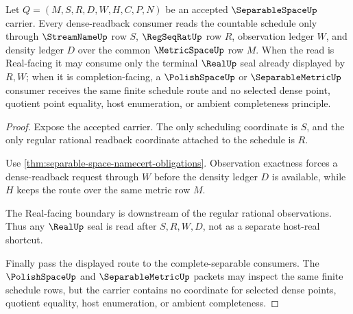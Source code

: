 \begin{theorem}
\label{thm:separable-space-streamname-dense-readback}
Let $Q=(M,S,R,D,W,H,C,P,N)$ be an accepted $\SeparableSpaceUp$ carrier. Every
dense-readback consumer reads the countable schedule only through
$\StreamNameUp$ row $S$, $\RegSeqRatUp$ row $R$, observation ledger $W$, and
density ledger $D$ over the common $\MetricSpaceUp$ row $M$. When the read is
Real-facing it may consume only the terminal $\RealUp$ seal already displayed
by $R,W$; when it is completion-facing, a $\PolishSpaceUp$ or
$\SeparableMetricUp$ consumer receives the same finite schedule route and no
selected dense point, quotient point equality, host enumeration, or ambient
completeness principle.
\end{theorem}
\begin{proof}
Expose the accepted carrier. The only scheduling coordinate is $S$, and the
only regular rational readback coordinate attached to the schedule is $R$.

Use \autoref{thm:separable-space-namecert-obligations}. Observation exactness
forces a dense-readback request through $W$ before the density ledger $D$ is
available, while $H$ keeps the route over the same metric row $M$.

The Real-facing boundary is downstream of the regular rational observations.
Thus any $\RealUp$ seal is read after $S,R,W,D$, not as a separate host-real
shortcut.

Finally pass the displayed route to the complete-separable consumers. The
$\PolishSpaceUp$ and $\SeparableMetricUp$ packets may inspect the same finite
schedule rows, but the carrier contains no coordinate for selected dense
points, quotient equality, host enumeration, or ambient completeness.
\end{proof}

